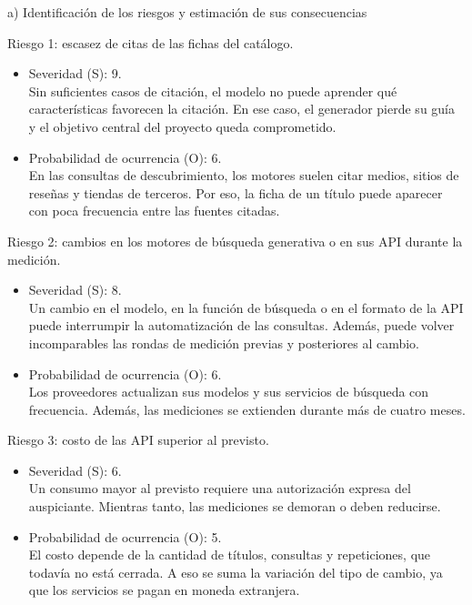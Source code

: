 \documentclass[
11pt, %
codirector, %
]{charter}
\begin{document}
a) Identificación de los riesgos y estimación de sus consecuencias

Riesgo 1: escasez de citas de las fichas del catálogo.
\begin{itemize}
	\item Severidad (S): 9.\\
	Sin suficientes casos de citación, el modelo no puede aprender qué características favorecen la citación. En ese caso, el generador pierde su guía y el objetivo central del proyecto queda comprometido.
	\item Probabilidad de ocurrencia (O): 6.\\
	En las consultas de descubrimiento, los motores suelen citar medios, sitios de reseñas y tiendas de terceros. Por eso, la ficha de un título puede aparecer con poca frecuencia entre las fuentes citadas.
\end{itemize}

Riesgo 2: cambios en los motores de búsqueda generativa o en sus API durante la medición.
\begin{itemize}
	\item Severidad (S): 8.\\
	Un cambio en el modelo, en la función de búsqueda o en el formato de la API puede interrumpir la automatización de las consultas. Además, puede volver incomparables las rondas de medición previas y posteriores al cambio.
	\item Probabilidad de ocurrencia (O): 6.\\
	Los proveedores actualizan sus modelos y sus servicios de búsqueda con frecuencia. Además, las mediciones se extienden durante más de cuatro meses.
\end{itemize}

Riesgo 3: costo de las API superior al previsto.
\begin{itemize}
	\item Severidad (S): 6.\\
	Un consumo mayor al previsto requiere una autorización expresa del auspiciante. Mientras tanto, las mediciones se demoran o deben reducirse.
	\item Probabilidad de ocurrencia (O): 5.\\
	El costo depende de la cantidad de títulos, consultas y repeticiones, que todavía no está cerrada. A eso se suma la variación del tipo de cambio, ya que los servicios se pagan en moneda extranjera.
\end{itemize}
\end{document}
